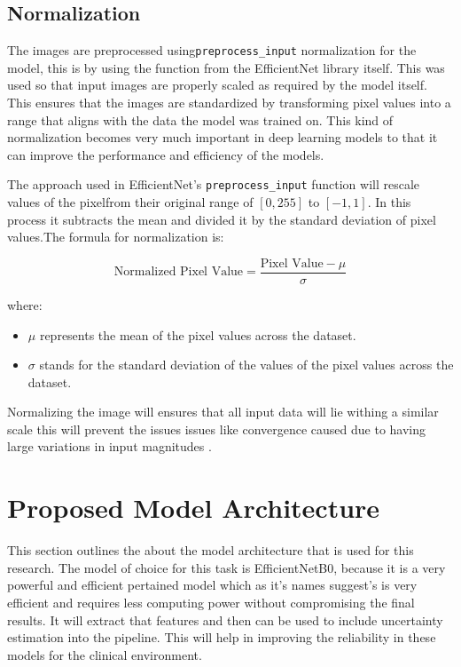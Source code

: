 \documentclass[12pt,onecolumn]{report}
\begin{document}
\subsection{Normalization}
The images are preprocessed using\texttt{preprocess\_input} normalization for the model, this is by using the  function from the EfficientNet library itself. This was used so that input images are properly scaled as required by the model itself. This ensures that the images are standardized by transforming pixel values into a range that aligns with the data the model was trained on. This kind of normalization becomes very much important in deep learning models to that it can improve the performance and efficiency of the models\cite{tan2019efficientnet}.

The approach used in EfficientNet's \texttt{preprocess\_input} function will rescale values of the pixelfrom their original range of $[0, 255]$ to $[-1, 1]$. In this process it subtracts the mean and divided it by the standard deviation of pixel values.The formula for normalization is:

\[
\text{Normalized Pixel Value} = \frac{\text{Pixel Value} - \mu}{\sigma}
\]

where:
\begin{itemize}
    \item $\mu$ represents the mean of the pixel values across the dataset.
    \item $\sigma$ stands for the standard deviation of the values of the pixel values across the dataset.
\end{itemize}

Normalizing the image will ensures that all input data will lie withing a similar scale this will prevent the issues issues like convergence caused due to having large variations in input magnitudes \cite{he2015delving}.

\section{Proposed Model Architecture}
This section outlines the about the model architecture that is used for this research. The model of choice for this task is EfficientNetB0, because it is a very powerful and efficient pertained model which as it's names suggest's is very efficient and requires less computing power without compromising the final results. It will extract that features and then can be used to include uncertainty estimation into the pipeline.  This will help in improving the reliability in these models for the clinical environment.
\end{document}
